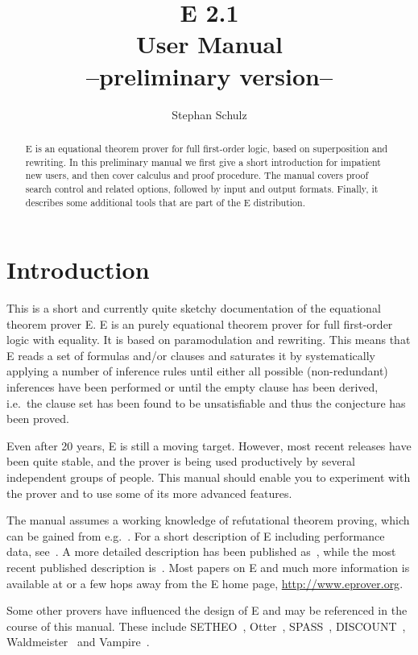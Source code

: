\documentclass{report}
\author{Stephan Schulz}
\title{E 2.1\\[1.5ex]User Manual\\[1.5ex]{\normalsize --preliminary
    version--}}
\begin{document}
\maketitle{}

\begin{abstract}
  E is an equational theorem prover for full first-order logic, based
  on superposition and rewriting. In this preliminary manual we first
  give a short introduction for impatient new users, and then cover
  calculus and proof procedure. The manual covers proof search control
  and related options, followed by input and output formats. Finally,
  it describes some additional tools that are part of the E
  distribution.
\end{abstract}

\tableofcontents{}

\chapter{Introduction}
\label{sec:intro}

This is a short and currently quite sketchy documentation of the
equational theorem prover E. E is an purely equational theorem prover
for full first-order logic with equality. It is based on
paramodulation and rewriting. This means that E reads a set of
formulas and/or clauses and saturates it by systematically applying a
number of inference rules until either all possible (non-redundant)
inferences have been performed or until the empty clause has been
derived, i.e.\ the clause set has been found to be unsatisfiable and
thus the conjecture has been proved.

Even after 20 years, E is still a moving target. However, most recent
releases have been quite stable, and the prover is being used
productively by several independent groups of people. This manual
should enable you to experiment with the prover and to use some of its
more advanced features.

The manual assumes a working knowledge of refutational theorem
proving, which can be gained from e.g.~\cite{CL73}. For a short
description of E including performance data,
see~\cite{Schulz:IJCAR-2004}. A more detailed description has been
published as~\cite{Schulz:AICOM-2002}, while the most recent published
description is~\cite{Schulz:LPAR-2013}. Most papers on E and much more
information is available at or a few hops away from the E home page,
\url{http://www.eprover.org}.

Some other provers have influenced the design of E and may be
referenced in the course of this manual. These include
SETHEO~\cite{MILSGSM:JAR-97},
Otter~\cite{Mc94,MW:JAR-97},
SPASS~\cite{WGR96,WABCEKTT:CADE-99},
DISCOUNT~\cite{DKS97}, Waldmeister~\cite{BHF96,HJL:CADE-99} and
Vampire~\cite{RV:AICOM-2002,RV:IJCAR-2001}.
\end{document}
